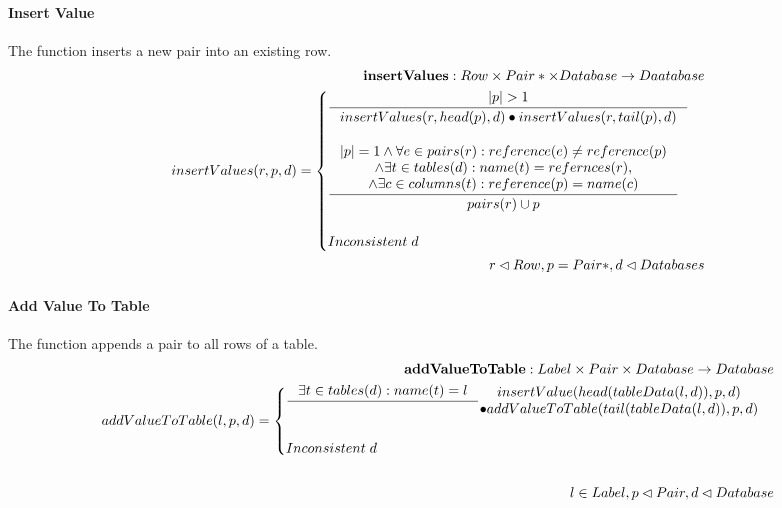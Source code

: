 \documentclass[11pt]{article}
\begin{document}
\paragraph{Insert Value} The function inserts a new pair into an existing row.
\begin{align*}
	\mathbf{insertValues} : Row \times Pair* \times Database \rightarrow Daatabase \\
	insertValues(r, p, d) = \begin{cases}
 		\inference{|p| > 1}{insertValues(r, head(p), d)\bullet insertValues(r, tail(p), d)}  \\ \\
 		\inference{|p| = 1 \wedge \forall e \in pairs(r) : reference(e) \neq reference(p) \\ \wedge \exists t \in tables(d) : name(t) = refernces(r), \\ \wedge \exists c \in columns(t) : reference(p) = name(c)}{pairs(r) \cup p} \\ \\
	 	 Inconsistent \; d
 		\end{cases} \\
r \lhd Row, p = Pair*,d \lhd Databases
\end{align*}

\paragraph{Add Value To Table} The function appends a pair to all rows of a table.
\begin{align*}
	\mathbf{addValueToTable} : Label \times Pair \times Database \rightarrow Database \\
	addValueToTable(l, p, d) = \begin{cases}
 		\inference{\exists t \in tables(d) : name(t) = l}	{\begin{gathered}
		insertValue(head(tableData(l, d)), p, d) \\ \bullet addValueToTable(tail(tableData(l, d)), p, d)
	\end{gathered}} \\ \\
 		Inconsistent \; d
 	\end{cases}\\ \\
 	l \in Label, p \lhd Pair,  d \lhd Database
\end{align*}
\end{document}
